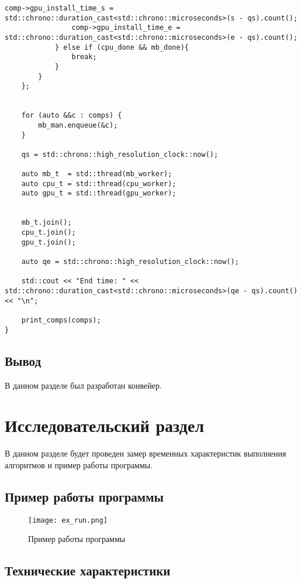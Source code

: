 \begin{lstlisting}[caption=Работа конвейеров, label=list:conveyor, language={}]
                comp->gpu_install_time_s = std::chrono::duration_cast<std::chrono::microseconds>(s - qs).count();
                comp->gpu_install_time_e = std::chrono::duration_cast<std::chrono::microseconds>(e - qs).count();
            } else if (cpu_done && mb_done){
                break;
            }
        }
    };


    for (auto &&c : comps) {
        mb_man.enqueue(&c);
    }

    qs = std::chrono::high_resolution_clock::now();

    auto mb_t  = std::thread(mb_worker);
    auto cpu_t = std::thread(cpu_worker);
    auto gpu_t = std::thread(gpu_worker);


    mb_t.join();
    cpu_t.join();
    gpu_t.join();

    auto qe = std::chrono::high_resolution_clock::now();

    std::cout << "End time: " << std::chrono::duration_cast<std::chrono::microseconds>(qe - qs).count() << "\n";

    print_comps(comps);
}
\end{lstlisting}

\subsection{Вывод}

В данном разделе был разработан конвейер.

\section {Исследовательский раздел}

В данном разделе будет проведен замер временных характеристик выполнения алгоритмов и пример работы программы.

\subsection{Пример работы программы}

\begin{figure}[H]
    \centering
    \texttt{[image: ex\_run.png]}
    \caption{Пример работы программы}
    \label{img:example_run}
\end{figure}


\subsection{Технические характеристики}

